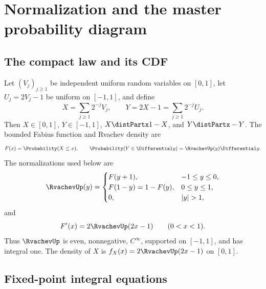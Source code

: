 \documentclass[11pt]{article}
\theoremstyle{definition}
\theoremstyle{remark}
\begin{document}
\section{Normalization and the master probability diagram}
\label{p2:sec:normalization}

\subsection{The compact law and its CDF}

Let $(V_j)_{j\ge1}$ be independent uniform random variables on $[0,1]$, let
$U_j=2V_j-1$ be uniform on $[-1,1]$, and define
\begin{equation}
 X=\sum_{j\ge1}2^{-j}V_j,
 \qquad
 Y=2X-1=\sum_{j\ge1}2^{-j}U_j.                       \label{p2:eq:XY}
\end{equation}
Then $X\in[0,1]$, $Y\in[-1,1]$, $X\distPartx1-X$, and $Y\distPartx-Y$.  The bounded Fabius
function and Rvachev density are
\begin{equation}
 F(x)=\Probability(X\le x),
 \qquad
 \Probability(Y\in\Differential y)=\RvachevUp(y)\Differential y.                       \label{p2:eq:F-up-law}
\end{equation}
The normalizations used below are
\begin{equation}
 \RvachevUp(y)=
 \begin{cases}
 F(y+1),&-1\le y\le0,\\
 F(1-y)=1-F(y),&0\le y\le1,\\
 0,&|y|>1,
 \end{cases}                                           \label{p2:eq:F-up-link}
\end{equation}
and
\begin{equation}
 F'(x)=2\RvachevUp(2x-1)\qquad(0<x<1).                         \label{p2:eq:Fprime-up}
\end{equation}
Thus $\RvachevUp$ is even, nonnegative, $C^\infty$, supported on $[-1,1]$, and has integral one.
The density of $X$ is $f_X(x)=2\RvachevUp(2x-1)$ on $[0,1]$.

\subsection{Fixed-point integral equations}
\end{document}
